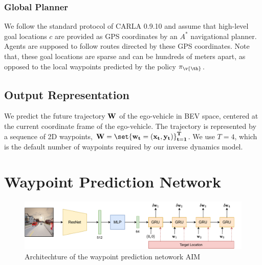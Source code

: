 \documentclass[letterpaper, 12pt]{book}
\theoremstyle{definition}
\theoremstyle{definition}
\theoremstyle{definition}
\theoremstyle{definition}
\theoremstyle{definition}
\begin{document}
\subsubsection{Global Planner}
\label{sec:org7b93ec3}
We follow the standard protocol of CARLA 0.9.10 and assume that high-level goal
locations \(c\) are provided as GPS coordinates by an \(A^{*}\) navigational
planner. Agents are supposed to follow routes directed by these GPS
coordinates. Note that, these goal locations are sparse and can be hundreds of
meters apart, as opposed to the local waypoints predicted by the policy
\(\pi_{\v{\th}}\).

\subsection{Output Representation}
\label{sec:org1f05357}
We predict the future trajectory \(\bf W\) of the ego-vehicle in BEV space,
centered at the current coordinate frame of the ego-vehicle. The trajectory is
represented by a sequence of 2D waypoints, \(\bf W = \set{\bf w_t = (x_t ,
y_t)}_{t=1}^{T}\).  We use \(T=4\), which is the default number of waypoints
required by our inverse dynamics model.

\section{Waypoint Prediction Network \label{org29bd17a}}
\label{sec:org45d062a}

\begin{figure}[htbp]
\centering
\includegraphics[keepaspectratio,width=\textwidth,height=\textheight]{./img/aim.pdf}
\caption{\label{fig:orgc058172}Architechture of the waypoint prediction netowork AIM \cite{Prakash2021}}
\end{figure}
\end{document}
